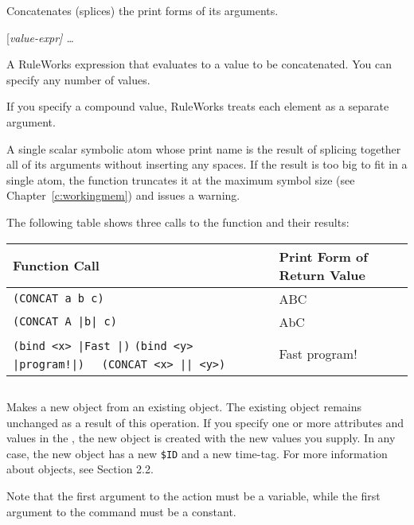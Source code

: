 Concatenates (splices) the print forms of its arguments.

\Format

 [\it{value-expr}] \ldots

\begin{argument}
\item[value-expr]

  A RuleWorks expression that evaluates to a value to be
  concatenated. You can specify any number of values.

  If you specify a compound value, RuleWorks treats each element as a
  separate argument.
\end{argument}

\ReturnValue

A single scalar symbolic atom whose print name is the result of
splicing together all of its arguments without inserting any
spaces. If the result is too big to fit in a single atom, the function
truncates it at the maximum symbol size (see
Chapter~\ref{c:workingmem}) and issues a warning.

\Example

The following table shows three calls to the  function and
their results:

\begin{tabularx}{\columnwidth}{Xl}
  \toprule
  Function Call & Print Form of Return Value \\
  \midrule
  \verb,(CONCAT a b c), & ABC \\
  \verb,(CONCAT A |b| c), & AbC \\
  \raggedright
  \verb,(bind <x> |Fast |), \verb,(bind <y> |program!|), \verb,  (CONCAT <x> || <y>), &  Fast program! \\
  \bottomrule
\end{tabularx}

\subsection{}

Makes a new object from an existing object. The existing object
remains unchanged as a result of this operation. If you specify
one or more attributes and values in the , the new object is
created with the new values you supply. In any case, the new
object has a new \verb|$ID| and a new time-tag. For more information
about objects, see Section 2.2.

Note that the first argument to the  action must be a
variable, while the first argument to the  command must be a
constant.

